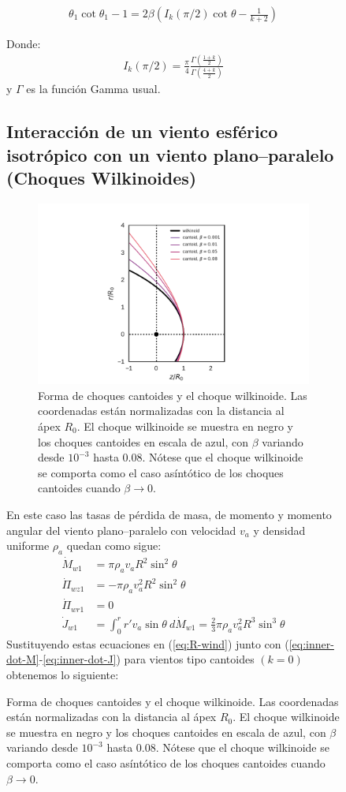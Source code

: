 \begin{figure}
\begin{align}
  \theta_1\cot\theta_1 - 1 = 2\beta\left(I_k(\pi/2)\cot\theta - \frac{1}{k+2}\right) \label{eq:th1-th-far-wings}
\end{align}

Donde:
\begin{align}
I_k(\pi/2) = \frac{\pi}{4}\frac{\Gamma\left(\frac{1+k}{2}\right)}{\Gamma\left(\frac{4+k}{2}\right)} 
\end{align}
y $\Gamma$ es la función Gamma usual.

\subsection{Interacción de un viento esférico isotrópico con un viento plano--paralelo (Choques Wilkinoides)}
\label{sec:wilkinoids}
\begin{figure} \includegraphics[width=0.6\linewidth]{./Figures/cantoid-wilkinoid-shape}
  \caption{Forma de choques cantoides y el choque wilkinoide. Las coordenadas están normalizadas con la distancia al ápex $R_0$. El choque wilkinoide se muestra en negro y los choques cantoides en escala de azul, con $\beta$ variando desde $10^{-3}$ hasta 0.08. Nótese que el choque wilkinoide se comporta como el caso asíntótico de los choques cantoides cuando $\beta\to 0$.}
\end{figure}
En este caso las tasas de pérdida de masa, de momento y momento angular del viento plano--paralelo con velocidad $v_a$ y densidad uniforme $\rho_a$ quedan como sigue:
\begin{align}
  \dot{M}_{w1} &= \pi \rho_a v_a R^2 \sin^2\theta\\
  \dot{\Pi}_{wz1} &= - \pi\rho_a v^2_a R^2 \sin^2\theta\\
  \dot{\Pi}_{wr1} &= 0 \\
  \dot{J}_{w1} &= \int^r_0 r'v_a \sin\theta~d\dot{M}_{w1} = \frac{2}{3}\pi\rho_a v_a^2 R^3 \sin^3\theta 
\end{align}
Sustituyendo estas ecuaciones en (\ref{eq:R-wind}) junto con (\ref{eq:inner-dot-M}-\ref{eq:inner-dot-J}) para vientos tipo cantoides $(k=0)$ obtenemos lo siguiente:

\end{figure}
